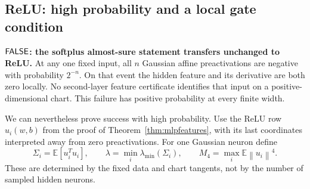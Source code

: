 \documentclass[12pt,a4paper]{article}
\theoremstyle{readable}
\theoremstyle{definition}\newtheorem{example}[theorem]{Example}
\newcommand{\norm}[1]{\left\|#1\right\|}
\begin{document}
\subsection{ReLU: high probability and a local gate condition}
\textbf{\(\mathsf{FALSE}\): the softplus almost-sure statement transfers unchanged to ReLU.} At any one fixed input, all \(n\) Gaussian affine preactivations are negative with probability \(2^{-n}\). On that event the hidden feature and its derivative are both zero locally. No second-layer feature certificate identifies that input on a positive-dimensional chart. This failure has positive probability at every finite width.

We can nevertheless prove success with high probability. Use the ReLU row \(u_i(w,b)\) from the proof of Theorem~\ref{thm:mlpfeatures}, with its last coordinates interpreted away from zero preactivations. For one Gaussian neuron define
\[
\Sigma_i=\mathbb E[u_i^Tu_i],\qquad
\lambda=\min_i\lambda_{\min}(\Sigma_i),\qquad
M_4=\max_i\mathbb E\norm{u_i}^4.
\]
These are determined by the fixed data and chart tangents, not by the number of sampled hidden neurons.
\end{document}
